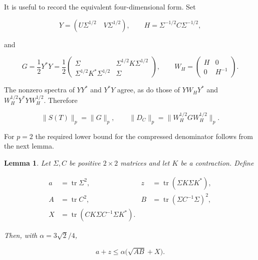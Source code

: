 \documentclass[11pt]{article}
\newtheorem{lemma}[theorem]{Lemma}
\begin{document}
It is useful to record the equivalent four-dimensional form. Set

\[
Y=(U\Sigma^{1/2}\quad V\Sigma^{1/2}),\qquad
H=\Sigma^{-1/2}C\Sigma^{-1/2},
\tag{6.7}\label{eq:6.7}
\]

and

\[
G=\frac12Y^*Y
=\frac12\begin{pmatrix}
\Sigma&\Sigma^{1/2}K\Sigma^{1/2}\\
\Sigma^{1/2}K^*\Sigma^{1/2}&\Sigma
\end{pmatrix},
\qquad
W_H=\begin{pmatrix}H&0\\0&H^{-1}\end{pmatrix}.
\tag{6.8}\label{eq:6.8}
\]

The nonzero spectra of $YY^*$ and $Y^*Y$ agree, as do those of
$YW_HY^*$ and $W_H^{1/2}Y^*YW_H^{1/2}$. Therefore

\[
\|S(T)\|_p=\|G\|_p,\qquad
\|D_C\|_p=\|W_H^{1/2}GW_H^{1/2}\|_p.
\tag{6.9}\label{eq:6.9}
\]

For $p=2$ the required lower bound for the compressed denominator follows from
the next lemma.

\begin{lemma}
\label{lem:frobenius-outer}
Let $\Sigma,C$ be positive $2\times2$ matrices and let $K$ be a
contraction. Define

\[
\begin{aligned}
a&=\operatorname{tr}\Sigma^2,
&z&=\operatorname{tr}(\Sigma K\Sigma K^*),\\
A&=\operatorname{tr}C^2,
&B&=\operatorname{tr}(\Sigma C^{-1}\Sigma)^2,\\
X&=\operatorname{tr}(CK\Sigma C^{-1}\Sigma K^*).
\end{aligned}
\tag{6.10}\label{eq:6.10}
\]

Then, with $\alpha=3\sqrt2/4$,

\[
a+z\le\alpha\bigl(\sqrt{AB}+X\bigr).
\tag{6.11}\label{eq:6.11}
\]

\end{lemma}
\end{document}
